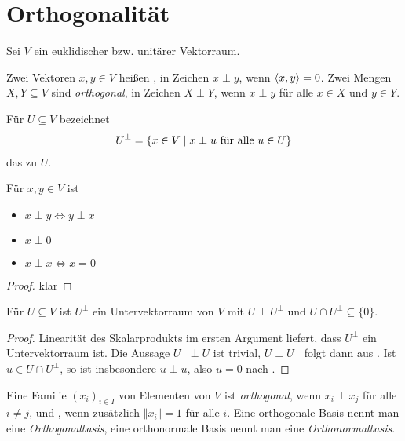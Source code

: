 \section{Orthogonalität}

Sei $V$ ein euklidischer bzw. unitärer Vektorraum.

\begin{definition}
	Zwei Vektoren $x,y\in V$ heißen , in Zeichen $x\perp y$, wenn $\left\langle x,y\right\rangle=0$. Zwei Mengen $X,Y\subseteq V$ sind \emph{orthogonal}, in Zeichen $X\perp Y$, wenn $x\perp y$ für alle $x\in X$ und $y\in Y$.
	
	Für $U\subseteq V$ bezeichnet 
	\begin{align}
		U^{\perp}=\{x\in V\mid x\perp u\text{ für alle } u\in U\}\notag
	\end{align}
	das  zu $U$.
\end{definition}

\begin{lemma}
	Für $x,y\in V$ ist
	\begin{itemize}
		\item $x\perp y\iff y\perp x$
		\item $x\perp 0$
		\item $x\perp x\iff x=0$
	\end{itemize}
\end{lemma}
\begin{proof}
	klar
\end{proof}

\begin{proposition}
	Für $U\subseteq V$ ist $U^\perp$ ein Untervektorraum von $V$ mit $U\perp U^\perp$ und $U\cap U^\perp \subseteq\{0\}$.
\end{proposition}
\begin{proof}
	Linearität des Skalarprodukts im ersten Argument liefert, dass $U^\perp$ ein Untervektorraum ist. Die Aussage $U^\perp \perp U$ ist trivial, $U \perp U^\perp$ folgt dann aus . Ist $u\in U\cap U^\perp$, so ist insbesondere $u\perp u$, also $u=0$ nach .
\end{proof}

\begin{definition}[orthonormal]
	Eine Familie $(x_i)_{i\in I}$ von Elementen von $V$ ist \emph{orthogonal}, wenn $x_i\perp x_j$ für alle $i\neq j$, und , wenn zusätzlich $\Vert x_i\Vert=1$ für alle $i$. Eine orthogonale Basis nennt man eine \emph{Orthogonalbasis}, eine orthonormale Basis nennt man eine \emph{Orthonormalbasis}.
\end{definition}

